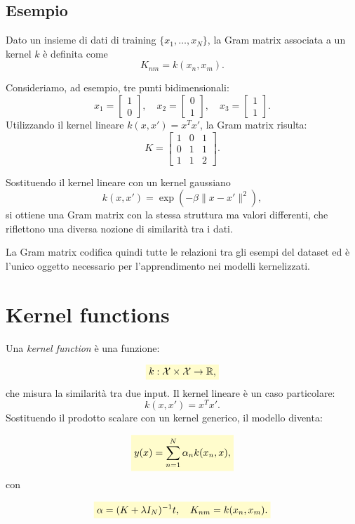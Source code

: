 \documentclass[a4paper,12pt]{report}
\newcommand{\highlight}[1]{%
\colorbox{yellow!20}{$\displaystyle #1$}%
}
\begin{document}
\subsection*{Esempio}

Dato un insieme di dati di training $\{x_1,\dots,x_N\}$, la Gram matrix associata a un kernel $k$ è definita come
\[
K_{nm} = k(x_n, x_m).
\]

Consideriamo, ad esempio, tre punti bidimensionali:
\[
x_1 = \begin{bmatrix}1 \\ 0\end{bmatrix}, \quad
x_2 = \begin{bmatrix}0 \\ 1\end{bmatrix}, \quad
x_3 = \begin{bmatrix}1 \\ 1\end{bmatrix}.
\]
Utilizzando il kernel lineare $k(x,x') = x^T x'$, la Gram matrix risulta:
\[
K =
\begin{bmatrix}
1 & 0 & 1 \\
0 & 1 & 1 \\
1 & 1 & 2
\end{bmatrix}.
\]

Sostituendo il kernel lineare con un kernel gaussiano
\[
k(x,x') = \exp(-\beta \|x-x'\|^2),
\]
si ottiene una Gram matrix con la stessa struttura ma valori differenti, che riflettono una diversa nozione di similarità tra i dati.

La Gram matrix codifica quindi tutte le relazioni tra gli esempi del dataset ed è l’unico oggetto necessario per l’apprendimento nei modelli kernelizzati.


\section{Kernel functions}

Una \emph{kernel function} è una funzione:

\[
\highlight{
k : \mathcal{X} \times \mathcal{X} \rightarrow \mathbb{R},}
\]
che misura la similarità tra due input. Il kernel lineare è un caso particolare:
\[
k(x,x') = x^T x'.
\]
Sostituendo il prodotto scalare con un kernel generico, il modello diventa:

\[
\highlight{
y(x) = \sum_{n=1}^{N} \alpha_n k(x_n, x),}
\]
con

\[
\highlight{
\alpha = (K + \lambda I_N)^{-1} t,
\quad K_{nm} = k(x_n, x_m).}
\]
\end{document}
